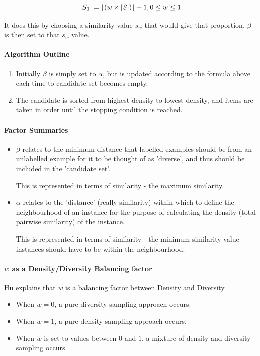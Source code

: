 \documentclass[a4paper,11pt]{report}
\begin{document}
\[
\left|S_{1}\right|=\left\lfloor \left(w\times\left|S\right|\right)\right\rfloor +1,\hphantom{}0\leq w\leq 1
\]

It does this by choosing a similarity value $s_{w}$ that would give that proportion. $\beta$ is then set to that $s_{w}$ value.

\paragraph{Algorithm Outline}
\begin{enumerate}
	\item Initially $\beta$ is simply set to $\alpha$, but is updated according to the formula above each time to candidate set becomes empty.
	\item The candidate is sorted from highest density to lowest density, and items are taken in order until the stopping condition is reached.
\end{enumerate}

\paragraph{Factor Summaries}
\begin{itemize}
	\item $\beta$ relates to the minimum distance  that labelled examples should be from an unlabelled example for it to be thought of as 'diverse', and thus should be included in the 'candidate set'. 
	
	This is represented in terms of similarity - the maximum similarity.

	\item $\alpha$ relates to the 'distance' (really similarity) within which to define the neighbourhood of an instance for the purpose of calculating the density (total pairwise similarity) of the instance. 
	
	This is represented in terms of similarity - the minimum similarity value instances should have to be within the neighbourhood.
	
\end{itemize}

\paragraph{$w$ as a Density/Diversity Balancing factor}
Hu explains that $w$ is a balancing factor between Density and Diversity\cite{Hu2010}. 

\begin{itemize}
	\item When $w=0$, a pure diversity-sampling approach occurs. 
	\item When $w=1$, a pure density-sampling approach occurs. 
	\item When $w$ is set to values between $0$ and $1$, a mixture of density and diversity sampling occurs.
\end{itemize}
\end{document}
